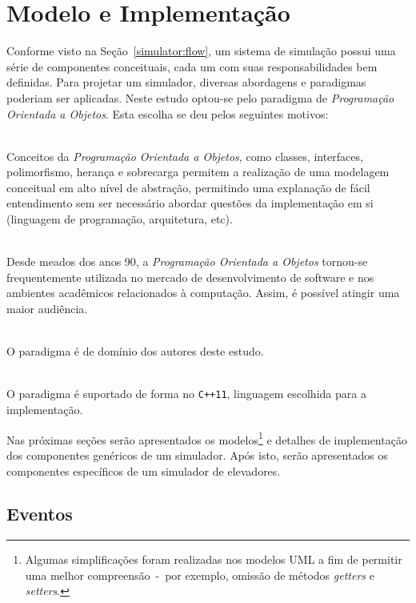 \chapter{\label{chap:model}Modelo e Implementação}

Conforme visto na Seção~\ref{simulator:flow}, um sistema de simulação possui uma
série de componentes conceituais, cada um com suas responsabilidades bem
definidas. Para projetar um simulador, diversas abordagens e paradigmas poderiam
ser aplicadas. Neste estudo optou-se pelo paradigma de \textit{Programação
Orientada a Objetos}. Esta escolha se deu pelos seguintes motivos:

\begin{description}\setlength\itemsep{0mm}
  \item[Capacidade de Abstração]\hfill \\
    Conceitos da \textit{Programação Orientada a Objetos}, como classes,
    interfaces, polimorfismo, herança e sobrecarga permitem a realização de uma
    modelagem conceitual em alto nível de abstração, permitindo uma explanação
    de fácil entendimento sem ser necessário abordar questões da implementação
    em si (linguagem de programação, arquitetura, etc).
  \item[Padrão de Mercado]\hfill \\
    Desde meados dos anos 90, a \textit{Programação Orientada a Objetos}
    tornou-se frequentemente utilizada no mercado de desenvolvimento de software
    e nos ambientes acadêmicos relacionados à computação. Assim, é possível
    atingir uma maior audiência.
  \item[Domínio dos Autores]\hfill \\
    O paradigma é de domínio dos autores deste estudo.
  \item[Suporte nativo no \texttt{C++}]\hfill \\
    O paradigma é suportado de forma no \texttt{C++11}, linguagem escolhida para
    a implementação.
\end{description}

Nas próximas seções serão apresentados os modelos\footnote{Algumas
simplificações foram realizadas nos modelos UML a fim de permitir uma melhor
compreensão~-~por exemplo, omissão de métodos \textit{getters} e
\textit{setters}.} e detalhes de implementação dos componentes genéricos de um
simulador. Após isto, serão apresentados os componentes específicos de um
simulador de elevadores.

\section{\label{model:events}Eventos}

